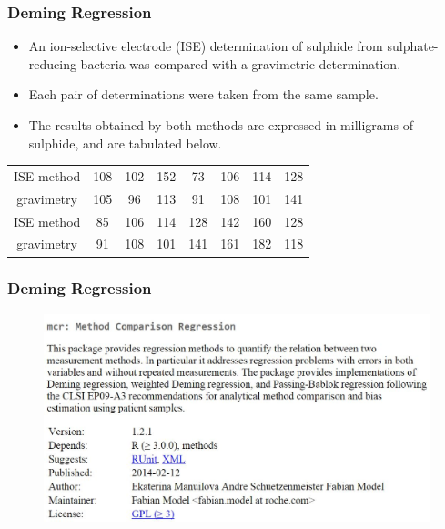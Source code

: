 \documentclass{beamer}
\begin{document}
\begin{frame}
	\frametitle{Deming Regression}
	\large
	\begin{itemize}
		\item	An ion-selective electrode (ISE) determination of sulphide from sulphate-reducing bacteria was compared with a gravimetric determination. 
		\item Each pair of determinations were taken from the same sample. 
		\item The results obtained by both methods are expressed in milligrams of sulphide, and are tabulated below.
	\end{itemize}
	
	\begin{center}
		\begin{tabular}{|c|ccccccc|}
			\hline
			ISE method & 108 & 102& 152 & 73 & 106 & 114 &  128   \\
			gravimetry & 105 & 96& 113 & 91 & 108 &  101 & 141  \\ 
			\hline
			\hline
			ISE method & 85 & 106 & 114 &  128 & 142& 160& 128 \\
			gravimetry &  91 & 108 &  101 & 141 & 161 & 182& 118\\
			\hline
		\end{tabular}
	\end{center}
	
\end{frame}
\begin{frame}
	\frametitle{Deming Regression}	\begin{figure}
		\centering
		\includegraphics[width=1.1\linewidth]{images/CRAN-mcr}
		
	\end{figure}
	
\end{frame}
\end{document}
